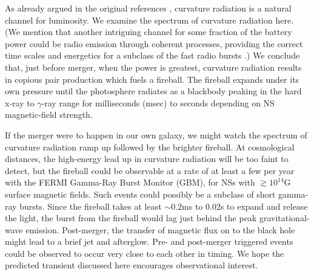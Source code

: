 As already argued in the original references
\citep{McL:2011,DL:2013}, curvature radiation is a natural
channel for luminosity.  We examine the spectrum of curvature
radiation here.  (We mention that another intriguing channel for some
fraction of the battery power could be radio emission through coherent
processes, providing the correct time scales and energetics for a
subclass of the fast radio bursts \citep{Chiara:2015}.)  We conclude
that, just before merger, when the power is greatest, curvature
radiation results in copious pair production which fuels a
fireball. The fireball expands under its own pressure until the
photosphere radiates as a blackbody peaking in the hard x-ray to
$\gamma$-ray range for milliseconds (msec) to seconds depending on NS
magnetic-field strength.  

If the merger were to happen in our own
galaxy, we might watch the spectrum of curvature radiation ramp up
followed by the brighter fireball. At cosmological distances, the
high-energy lead up in curvature radiation will be too faint to
detect, but the fireball could be observable at a rate of at least a
few per year with the FERMI Gamma-Ray Burst Monitor (GBM), for NSs
with $\gtrsim10^{14}$G surface magnetic fields.  Such events 
could possibly be a subclass of short gamma-ray
bursts. Since the fireball takes at least $\sim 0.2$ms to $0.02$s 
to expand and release the light, the burst from the
fireball would lag just behind the peak gravitational-wave emission.
Post-merger, the transfer of magnetic flux on to the black hole might
lead to a brief jet and afterglow. 
Pre- and post-merger triggered events could be observed to occur very close to each other in timing.
We hope the predicted transient discussed here encourages observational interest.



